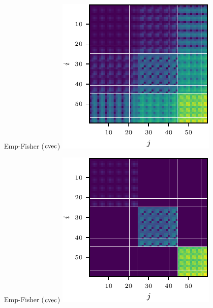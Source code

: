 \begin{figure}[t!]
\begin{minipage}[t]{0.485\linewidth}
  \end{minipage}
  \\
  \begin{minipage}[t]{0.485\linewidth}
    \centering
    Emp-Fisher ($\operatorname{cvec}$)\vspace{1ex}
    \includegraphics[width=0.8\linewidth]{../kfs/plots/synthetic_cvec_empfisher_full.pdf}
  \end{minipage}
  \hfill
  \begin{minipage}[t]{0.485\linewidth}
    \centering
    Emp-Fisher ($\operatorname{cvec}$)\vspace{1ex}
    \includegraphics[width=0.8\linewidth]{../kfs/plots/synthetic_cvec_empfisher_kfac.pdf}

\end{minipage}
\end{figure}
